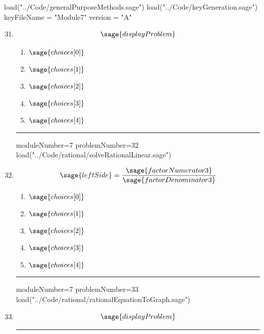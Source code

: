 \documentclass[14pt]{article}
\newcommand{\litem}[1]{\item#1\hspace*{-1cm}\rule{\textwidth}{0.4pt}}
\begin{document}
\pagestyle{fancy}

\begin{sagesilent}
load("../Code/generalPurposeMethods.sage")
load("../Code/keyGeneration.sage")
keyFileName = "Module7"
version = "A"
\end{sagesilent}

\begin{enumerate}
\setcounter{enumi}{30}


\begin{sagesilent}
moduleNumber=7
problemNumber=31
load("../Code/rational/domainRational.sage")
\end{sagesilent}

\litem{ 

\[ \sage{displayProblem} \]

	\begin{enumerate}[label=\Alph*.]
		\item \( \sage{choices[0]} \)
		\item \( \sage{choices[1]} \)
		\item \( \sage{choices[2]} \)
		\item \( \sage{choices[3]} \)
		\item \( \sage{choices[4]} \)
	\end{enumerate}
}

\begin{sagesilent}
moduleNumber=7
problemNumber=32
load("../Code/rational/solveRationalLinear.sage")
\end{sagesilent}

\litem{ 

	\[ \sage{leftSide} = \frac{\sage{factorNumerator3}}{\sage{factorDenominator3}}  \]

	\begin{enumerate}[label=\Alph*.]
    \item \( \sage{choices[0]} \)
    \item \( \sage{choices[1]} \)
    \item \( \sage{choices[2]} \)
    \item \( \sage{choices[3]} \)
    \item \( \sage{choices[4]} \)
	\end{enumerate}
}

\begin{sagesilent}
moduleNumber=7
problemNumber=33
load("../Code/rational/rationalEquationToGraph.sage")
\end{sagesilent}

\litem{ 
\[ \sage{displayProblem} \]

}
\end{enumerate}
\end{document}
